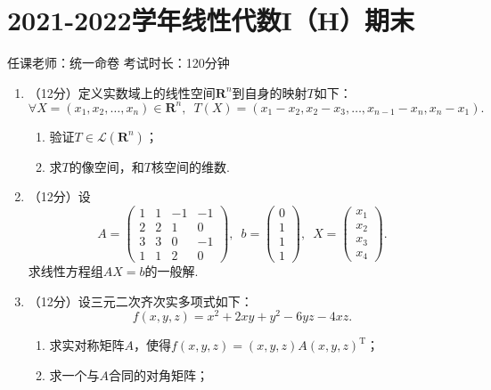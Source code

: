\section{2021-2022学年线性代数I（H）期末}

\begin{center}
    任课老师：统一命卷\hspace{4em} 考试时长：120分钟
\end{center}

\begin{enumerate}
    \item （12分）定义实数域上的线性空间$\mathbf{R}^n$到自身的映射$T$如下：
	\[\forall X=(x_1,x_2,\ldots,x_n)\in\mathbf{R}^n,\enspace T(X)=(x_1-x_2,x_2-x_3,\ldots,x_{n-1}-x_n,x_n-x_1).\]
    \begin{enumerate}
        \item 验证$T\in\mathcal{L}(\mathbf{R}^n)$；

        \item 求$T$的像空间，和$T$核空间的维数.
    \end{enumerate}
	\item （12分）设
	\[A=\begin{pmatrix}
        1 & 1 & -1 & -1 \\ 2 & 2 & 1 & 0 \\ 3 & 3 & 0 & -1 \\ 1 & 1 & 2 & 0
    \end{pmatrix},\enspace b=\begin{pmatrix}
        0 \\ 1 \\ 1 \\ 1
    \end{pmatrix},\enspace X=\begin{pmatrix}
        x_1 \\ x_2 \\ x_3 \\ x_4
    \end{pmatrix}.\]
    求线性方程组$AX=b$的一般解.
	\item （12分）设三元二次齐次实多项式如下：
	\[f(x,y,z)=x^2+2xy+y^2-6yz-4xz.\]
    \begin{enumerate}
        \item 求实对称矩阵$A$，使得$f(x,y,z)=(x, y, z)A(x, y, z)^\mathrm{T}$；

        \item 求一个与$A$合同的对角矩阵；


\end{enumerate}
\end{enumerate}
